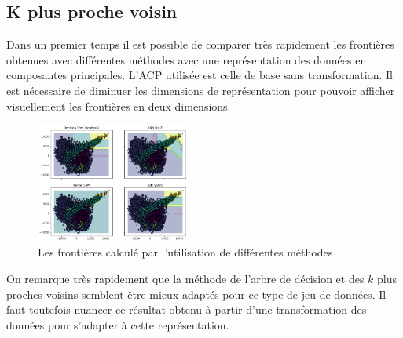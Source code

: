 \documentclass[twocolumn,10pt]{article}
\begin{document}
\subsection{K plus proche voisin}
Dans un premier temps il est possible de comparer très rapidement les frontières obtenues avec différentes méthodes avec une représentation des données en composantes principales. L'ACP utilisée est celle de base sans transformation. Il est nécessaire de diminuer les dimensions de représentation pour pouvoir afficher visuellement les frontières en deux dimensions.  

\begin{figure}[htbp]
\begin{center}
\includegraphics[width=0.45\textwidth]{figures/ACP_learningAlgo.png}
\caption{\label{fig:ACP_learningAlgo}Les frontières calculé par l'utilisation de différentes méthodes}
\end{center}
\end{figure}

On remarque très rapidement que la méthode de l'arbre de décision et des $k$ plus proches voisins semblent être mieux adaptés pour ce type de jeu de données. Il faut toutefois nuancer ce résultat obtenu à partir d'une transformation des données pour s'adapter à cette représentation. 
\end{document}
